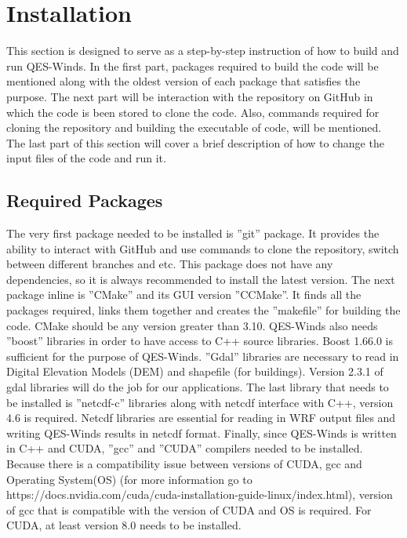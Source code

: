 \section{Installation}

This section is designed to serve as a step-by-step instruction of how to build and run QES-Winds. In the first part, packages required to build the code will be mentioned along with the oldest version of each package that satisfies the purpose. The next part will be interaction with the repository on GitHub in which the code is been stored to clone the code. Also, commands required for cloning the repository and building the executable of code, will be mentioned. The last part of this section will cover a brief description of how to change the input files of the code and run it.

\subsection{Required Packages}

The very first package needed to be installed is ''git'' package. It provides the ability to interact with GitHub and use commands to clone the repository, switch between different branches and etc. This package does not have any dependencies, so it is always recommended to install the latest version. The next package inline is ''CMake'' and its GUI version ''CCMake''. It finds all the packages required, links them together and creates the ''makefile'' for building the code. CMake should be any version greater than 3.10.
QES-Winds also needs ''boost'' libraries in order to have access to C++ source libraries. Boost 1.66.0 is sufficient for the purpose of QES-Winds. ''Gdal'' libraries are necessary to read in Digital Elevation Models (DEM) and shapefile (for buildings). Version 2.3.1 of gdal libraries will do the job for our applications. The last library that needs to be installed is ''netcdf-c'' libraries along with netcdf interface with C++, version 4.6 is required. Netcdf libraries are essential for reading in WRF output files and writing QES-Winds results in netcdf format.
Finally, since QES-Winds is written in C++ and CUDA, ''gcc'' and ''CUDA'' compilers needed to be installed. Because there is a compatibility issue between versions of CUDA, gcc and Operating System(OS) (for more information go to https://docs.nvidia.com/cuda/cuda-installation-guide-linux/index.html), version of gcc that is compatible with the version of CUDA and OS is required. For CUDA, at least version 8.0 needs to be installed.

